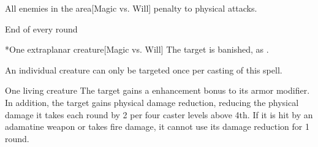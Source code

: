 \begin{comment}
\subsubsection{B}
\end{comment}

\begin{spelltargets}{All enemies in the area}[Magic vs. Will]
    \spellsuccess {} penalty to physical attacks.
\end{spelltargets}

\spellrng{\rngmed}
\spellline
\begin{spelltrigger}{End of every round}
    \begin{spelltarget}*{One extraplanar creature}[Magic vs. Will]
        \spellsuccess The target is banished, as .
    \end{spelltarget}
\end{spelltrigger}
\spelleffect An individual creature can only be targeted once per casting of this spell.

\spelldur{\durshort}
\begin{spelltarget}{One living creature}
    \spelleffect The target gains a  enhancement bonus to its armor modifier. \spellbonusscalingdescription In addition, the target gains physical damage reduction, reducing the physical damage it takes each round by 2  per four caster levels above 4th. If it is hit by an adamatine weapon or takes fire damage, it cannot use its damage reduction for 1 round.
\end{spelltarget}

